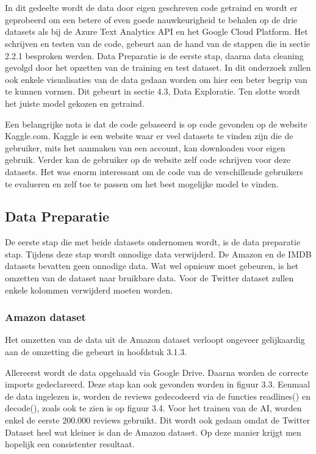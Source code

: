 \chapter{}
\label{ch:proof-of-concept}

In dit gedeelte wordt de data door eigen geschreven code getraind en wordt er geprobeerd om een betere of even goede nauwkeurigheid te behalen op de drie datasets als bij de Azure Text Analytics API en het Google Cloud Platform. Het schrijven en testen van de code, gebeurt aan de hand van de stappen die in sectie 2.2.1 besproken werden. Data Preparatie is de eerste stap, daarna data cleaning gevolgd door het opzetten van de training en test dataset. In dit onderzoek zullen ook enkele visualisaties van de data gedaan worden om hier een beter begrip van te kunnen vormen. Dit gebeurt in sectie 4.3, Data Exploratie. Ten slotte wordt het juiste model gekozen en getraind. 

Een belangrijke nota is dat de code gebaseerd is op code gevonden op de website Kaggle.com. Kaggle is een website waar er veel datasets te vinden zijn die de gebruiker, mits het aanmaken van een account, kan downloaden voor eigen gebruik. Verder kan de gebruiker op de website zelf code schrijven voor deze datasets. Het was enorm interessant om de code van de verschillende gebruikers te evalueren en zelf toe te passen om het best mogelijke model te vinden. \autocite{Kaggle2021}

\section{Data Preparatie}
\label{proofofconceptdatapreparatie}
De eerste stap die met beide datasets ondernomen wordt, is de data preparatie stap. Tijdens deze stap wordt onnodige data verwijderd. De Amazon en de IMDB datasets bevatten geen onnodige data. Wat wel opnieuw moet gebeuren, is het omzetten van de dataset naar bruikbare data. Voor de Twitter dataset zullen enkele kolommen verwijderd moeten worden.

\subsection{Amazon dataset}
Het omzetten van de data uit de Amazon dataset verloopt ongeveer gelijkaardig aan de omzetting die gebeurt in hoofdstuk 3.1.3.

Allereerst wordt de data opgehaald via Google Drive. Daarna worden de correcte imports gedeclareerd. Deze stap kan ook gevonden worden in figuur 3.3. Eenmaal de data ingelezen is, worden de reviews gedecodeerd via de functies readlines() en decode(), zoals ook te zien is op figuur 3.4. Voor het trainen van de AI, worden enkel de eerste 200.000 reviews gebruikt. Dit wordt ook gedaan omdat de Twitter Dataset heel wat kleiner is dan de Amazon dataset. Op deze manier krijgt men hopelijk een consistenter resultaat. 

